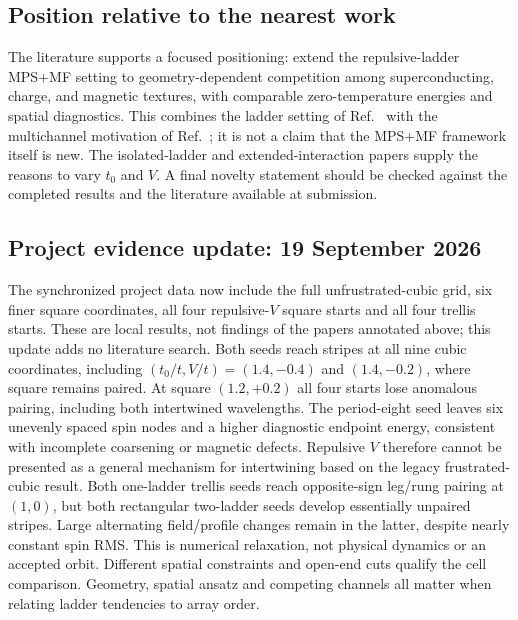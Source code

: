 \documentclass[11pt]{article}
\begin{document}
\subsection*{Position relative to the nearest work}
The literature supports a focused positioning: extend the repulsive-ladder MPS+MF setting to geometry-dependent competition among superconducting, charge, and magnetic textures, with comparable zero-temperature energies and spatial diagnostics. This combines the ladder setting of Ref.~\citep{Bollmark2023} with the multichannel motivation of Ref.~\citep{Bollmark2025}; it is not a claim that the MPS+MF framework itself is new. The isolated-ladder and extended-interaction papers supply the reasons to vary $t_0$ and $V$. A final novelty statement should be checked against the completed results and the literature available at submission.

\subsection*{Project evidence update: 19 September 2026}

The synchronized project data now include the full unfrustrated-cubic grid,
six finer square coordinates, all four repulsive-$V$ square starts
and all four trellis starts. These are local results, not findings
of the papers annotated above; this update adds no literature search.
Both seeds reach stripes at all nine cubic coordinates, including
$(t_0/t,V/t)=(1.4,-0.4)$ and $(1.4,-0.2)$, where square remains paired.
At square $(1.2,+0.2)$ all four starts lose anomalous pairing, including
both intertwined wavelengths. The period-eight seed leaves six unevenly
spaced spin nodes and a higher diagnostic endpoint energy, consistent with
incomplete coarsening or magnetic defects. Repulsive $V$ therefore cannot
be presented as a general mechanism for intertwining based on the legacy
frustrated-cubic result. Both one-ladder trellis seeds reach opposite-sign
leg/rung pairing at $(1,0)$, but both rectangular two-ladder seeds develop
essentially unpaired stripes. Large alternating field/profile changes remain
in the latter, despite nearly constant spin RMS. This is numerical relaxation,
not physical dynamics or an accepted orbit. Different spatial constraints
and open-end cuts qualify the cell comparison. Geometry, spatial ansatz and
competing channels all matter when relating ladder tendencies to array order.
\end{document}

